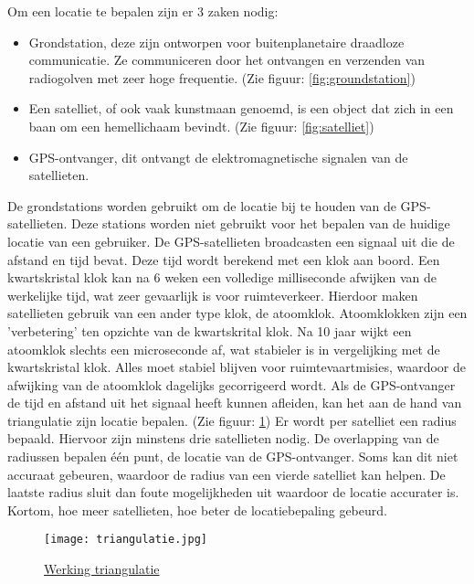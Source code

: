 Om een locatie te bepalen zijn er 3 zaken nodig:
\begin{itemize}
	\item Grondstation, deze zijn ontworpen voor buitenplanetaire draadloze communicatie. Ze communiceren door het ontvangen en verzenden van radiogolven met zeer hoge frequentie. (Zie figuur: \ref{fig:groundstation})
	\item Een satelliet, of ook vaak kunstmaan genoemd, is een object dat zich in een baan om een hemellichaam bevindt. \autocite{definitie_satelliet} (Zie figuur: \ref{fig:satelliet})
	\item GPS-ontvanger, dit ontvangt de elektromagnetische signalen van de satellieten.
\end{itemize}

De grondstations worden gebruikt om de locatie bij te houden van de GPS-satellieten. Deze stations worden niet gebruikt voor het bepalen van de huidige locatie van een gebruiker. 
\newline
\newline
De GPS-satellieten broadcasten een signaal uit die de afstand en tijd bevat. Deze tijd wordt berekend met een klok aan boord. Een kwartskristal klok kan na 6 weken een volledige milliseconde afwijken van de werkelijke tijd, wat zeer gevaarlijk is voor ruimteverkeer. Hierdoor maken satellieten gebruik van een ander type klok, de atoomklok. Atoomklokken zijn een 'verbetering' ten opzichte van de kwartskrital klok.  Na 10 jaar wijkt een atoomklok slechts een microseconde af, wat stabieler is in vergelijking met de kwartskristal klok. Alles moet stabiel blijven voor ruimtevaartmisies, waardoor de afwijking van de atoomklok dagelijks gecorrigeerd wordt. \autocite{atomic_clock}
\newline
Als de GPS-ontvanger de tijd en afstand uit het signaal heeft kunnen afleiden, kan het aan de hand van triangulatie zijn locatie bepalen. (Zie figuur: \ref{fig:triangulatie})
Er wordt per satelliet een radius bepaald. Hiervoor zijn minstens drie satellieten nodig. De overlapping van de radiussen bepalen één punt, de locatie van de GPS-ontvanger. Soms kan dit niet accuraat gebeuren, waardoor de radius van een vierde satelliet kan helpen. De laatste radius sluit dan foute mogelijkheden uit waardoor de locatie accurater is. Kortom, hoe meer satellieten, hoe beter de locatiebepaling gebeurd. 

\begin{figure}
	\texttt{[image: triangulatie.jpg]}
	\caption{\href{https://communicatiekc.com/triangulatie/}{Werking triangulatie}}
	\label{fig:triangulatie}
\end{figure} 
\pagebreak
